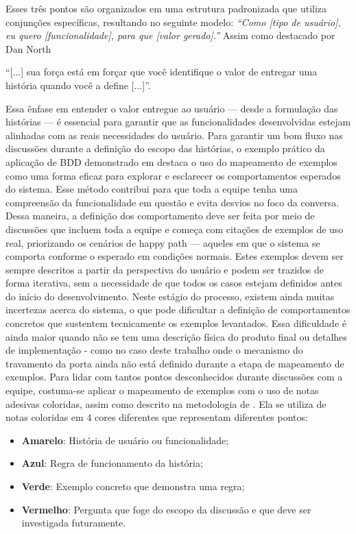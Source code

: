 Esses três pontos são organizados em uma estrutura padronizada que utiliza conjunções específicas, resultando no seguinte modelo:
\textit{“Como [tipo de usuário], eu quero [funcionalidade], para que [valor gerado].”}
Assim como destacado por Dan North 
\begin{citacao}
“[...] sua força está em forçar que você identifique o valor de entregar uma história quando você a define [...]”. \cite{north2006bdd}
\end{citacao}
Essa ênfase em entender o valor entregue ao usuário — desde a formulação das histórias — é essencial para garantir que as funcionalidades desenvolvidas estejam 
alinhadas com as reais necessidades do usuário.
Para garantir um bom fluxo nas discussões durante a definição do escopo das histórias, o exemplo prático da aplicação de BDD demonstrado em \cite{Lawrence2019cucumber} 
destaca o uso do mapeamento de exemplos como uma forma eficaz para explorar e esclarecer os comportamentos esperados do sistema. Esse método contribui para que 
toda a equipe tenha uma compreensão da funcionalidade em questão e evita desvios no foco da conversa.
Dessa maneira, a definição dos comportamento deve ser feita por meio de discussões que incluem toda a equipe e começa com citações de exemplos de uso real, priorizando 
os cenários de happy path — aqueles em que o sistema se comporta conforme o esperado em condições normais. Estes exemplos devem ser sempre descritos a partir da 
perspectiva do usuário e podem ser trazidos de forma iterativa, sem a necessidade de que todos os casos estejam definidos antes do início do desenvolvimento. 
Neste estágio do processo, existem ainda muitas incertezas acerca do sistema, o que pode dificultar a definição de comportamentos concretos que sustentem 
tecnicamente os exemplos levantados. Essa dificuldade é ainda maior quando não se tem uma descrição física do produto final ou detalhes de implementação - como no 
caso deste trabalho onde o mecanismo do travamento da porta ainda não está definido durante a etapa de mapeamento de exemplos.
Para lidar com tantos pontos desconhecidos durante discussões com a equipe, costuma-se aplicar o mapeamento de exemplos com o uso de notas adesivas coloridas, 
assim como descrito na metodologia de \cite{cucumberExampleMapping}. Ela se utiliza de notas coloridas em 4 cores diferentes que representam diferentes pontos:

\begin{itemize}
	\item \textbf{Amarelo}: História de usuário ou funcionalidade;
	\item \textbf{Azul}: Regra de funcionamento da história;
	\item \textbf{Verde}: Exemplo concreto que demonstra uma regra;
	\item \textbf{Vermelho}: Pergunta que foge do escopo da discussão e que deve ser investigada futuramente.
\end{itemize}

